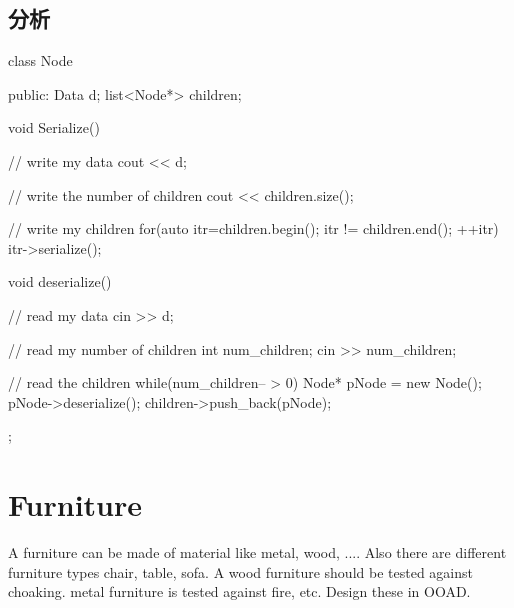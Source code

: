 \subsection{分析}
\begin{Code}
	class Node {
	public:
		Data d;
		list<Node*> children;
		
		void Serialize() {
			// write my data
			cout << d;
			
			// write the number of children
			cout << children.size();
			
			// write my children
			for(auto itr=children.begin(); itr != children.end(); ++itr) itr->serialize();
		}
		
		void deserialize() {
			// read my data
			cin >> d;
			
			// read my number of children
			int num_children;
			cin >> num_children;
			
			// read the children
			while(num_children-- > 0) {
				Node* pNode = new Node();
				pNode->deserialize();
				children->push_back(pNode);
			}
		}
	};
\end{Code}

\section{Furniture}
A furniture can be made of material like metal, wood, .... Also there are different furniture types chair, table, sofa. A wood furniture should be tested against choaking. metal
furniture is tested against fire, etc. Design these in OOAD.


